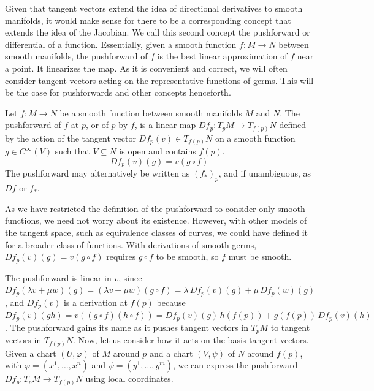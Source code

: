 \documentclass[a4paper,12pt]{article}
\begin{document}
Given that tangent vectors extend the idea of directional derivatives to smooth manifolds, it would make sense for there to be a corresponding concept that extends the idea of the Jacobian.
We call this second concept the pushforward or differential of a function.
Essentially, given a smooth function $f \colon M \to N$ between smooth manifolds, the pushforward of $f$ is the best linear approximation of $f$ near a point.
It linearizes the map.
As it is convenient and correct, we will often consider tangent vectors acting on the representative functions of germs.
This will be the case for pushforwards and other concepts henceforth.
\begin{definition}[Pushforward]\label{def:pushforward}
    Let $f \colon M \to N$ be a smooth function between smooth manifolds $M$ and $N$.
    The pushforward of $f$ at $p$, or of $p$ by $f$, is a linear map $Df_p \colon T_p M \to T_{f(p)} N$ defined by the action of the tangent vector $Df_p(v) \in T_{f(p)} N$ on a smooth function $g \in C^\infty(V)$ such that $V \subseteq N$ is open and contains $f(p)$.
    \begin{equation}
        Df_p(v)(g) = v(g \circ f)
    \end{equation}
    The pushforward may alternatively be written as $(f_*)_p$, and if unambiguous, as $Df$ or $f_*$.
\end{definition}
\begin{remark}
    As we have restricted the definition of the pushforward to consider only smooth functions, we need not worry about its existence.
    However, with other models of the tangent space, such as equivalence classes of curves, we could have defined it for a broader class of functions.
    With derivations of smooth germs, $Df_p(v)(g) = v(g \circ f)$ requires $g \circ f$ to be smooth, so $f$ must be smooth.
\end{remark}
The pushforward is linear in $v$, since $Df_p(\lambda v + \mu w)(g) = (\lambda v + \mu w)(g \circ f) = \lambda \, Df_p(v)(g) + \mu \, Df_p(w)(g)$, and $Df_p(v)$ is a derivation at $f(p)$ because $Df_p(v)(gh) = v((g \circ f)(h \circ f)) = Df_p(v)(g) \, h(f(p)) + g(f(p)) \, Df_p(v)(h)$.
The pushforward gains its name as it pushes tangent vectors in $T_p M$ to tangent vectors in $T_{f(p)} N$.
Now, let us consider how it acts on the basis tangent vectors.
Given a chart $(U, \varphi)$ of $M$ around $p$ and a chart $(V, \psi)$ of $N$ around $f(p)$, with $\varphi = (x^1, \ldots, x^n)$ and $\psi = (y^1, \ldots, y^m)$, we can express the pushforward $Df_p \colon T_p M \to T_{f(p)} N$ using local coordinates.
\end{document}
